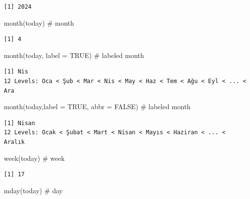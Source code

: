 \documentclass[
  letterpaper,
  DIV=11,
  numbers=noendperiod]{scrreprt}
\newenvironment{Shaded}{\begin{snugshade}}{\end{snugshade}}
\newcommand{\AttributeTok}[1]{\textcolor[rgb]{0.40,0.45,0.13}{#1}}
\newcommand{\CommentTok}[1]{\textcolor[rgb]{0.37,0.37,0.37}{#1}}
\newcommand{\ConstantTok}[1]{\textcolor[rgb]{0.56,0.35,0.01}{#1}}
\newcommand{\FunctionTok}[1]{\textcolor[rgb]{0.28,0.35,0.67}{#1}}
\newcommand{\NormalTok}[1]{\textcolor[rgb]{0.00,0.23,0.31}{#1}}
\begin{document}
\begin{verbatim}
[1] 2024
\end{verbatim}

\begin{Shaded}
\begin{Highlighting}[]
\FunctionTok{month}\NormalTok{(today) }\CommentTok{\# month}
\end{Highlighting}
\end{Shaded}

\begin{verbatim}
[1] 4
\end{verbatim}

\begin{Shaded}
\begin{Highlighting}[]
\FunctionTok{month}\NormalTok{(today, }\AttributeTok{label =} \ConstantTok{TRUE}\NormalTok{) }\CommentTok{\# labeled month}
\end{Highlighting}
\end{Shaded}

\begin{verbatim}
[1] Nis
12 Levels: Oca < Şub < Mar < Nis < May < Haz < Tem < Ağu < Eyl < ... < Ara
\end{verbatim}

\begin{Shaded}
\begin{Highlighting}[]
\FunctionTok{month}\NormalTok{(today,}\AttributeTok{label =} \ConstantTok{TRUE}\NormalTok{, }\AttributeTok{abbr =} \ConstantTok{FALSE}\NormalTok{) }\CommentTok{\# labeled month}
\end{Highlighting}
\end{Shaded}

\begin{verbatim}
[1] Nisan
12 Levels: Ocak < Şubat < Mart < Nisan < Mayıs < Haziran < ... < Aralık
\end{verbatim}

\begin{Shaded}
\begin{Highlighting}[]
\FunctionTok{week}\NormalTok{(today) }\CommentTok{\# week}
\end{Highlighting}
\end{Shaded}

\begin{verbatim}
[1] 17
\end{verbatim}

\begin{Shaded}
\begin{Highlighting}[]
\FunctionTok{mday}\NormalTok{(today) }\CommentTok{\# day}
\end{Highlighting}
\end{Shaded}
\end{document}
